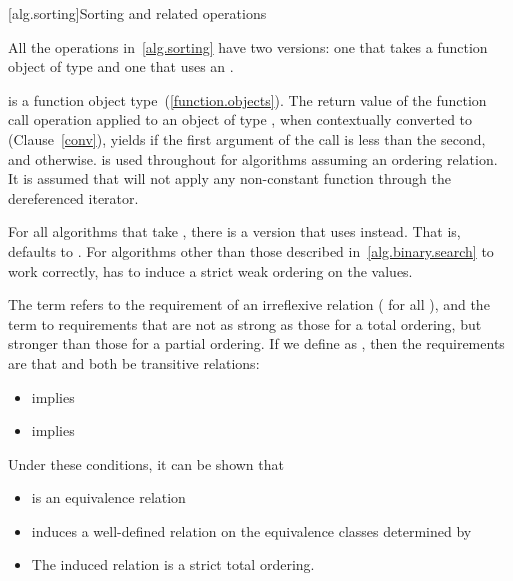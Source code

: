 [alg.sorting]{Sorting and related operations}

\pnum
All the operations in~\ref{alg.sorting} have two versions: one that takes a function object of type
and one that uses an
.

\pnum
{}
is a function object
type~(\ref{function.objects}). The return value of the function call operation applied to
an object of type , when contextually converted to
 (Clause~\ref{conv}),
yields  if the first argument of the call
is less than the second, and
otherwise.
is used throughout for algorithms assuming an ordering relation.
It is assumed that
will not apply any non-constant function through the dereferenced iterator.

\pnum
For all algorithms that take
,
there is a version that uses
instead.
That is,
defaults to
.
For algorithms other than those described in~\ref{alg.binary.search} to work correctly,
 has to induce a strict weak ordering on the values.

\pnum
The term
refers to the
requirement of an irreflexive relation ( for all ),
and the term
to requirements that are not as strong as
those for a total ordering,
but stronger than those for a partial
ordering.
If we define
as
,
then the requirements are that
and
both be transitive  relations:

\begin{itemize}
\item
{}
implies
\item
{}
implies
\end{itemize}
\enternote
Under these conditions, it can be shown that
\begin{itemize}
\item
{}
is an equivalence relation
\item
{}
induces a well-defined relation on the equivalence
classes determined by
\item
The induced relation is a strict total ordering.
\end{itemize}
\exitnote

